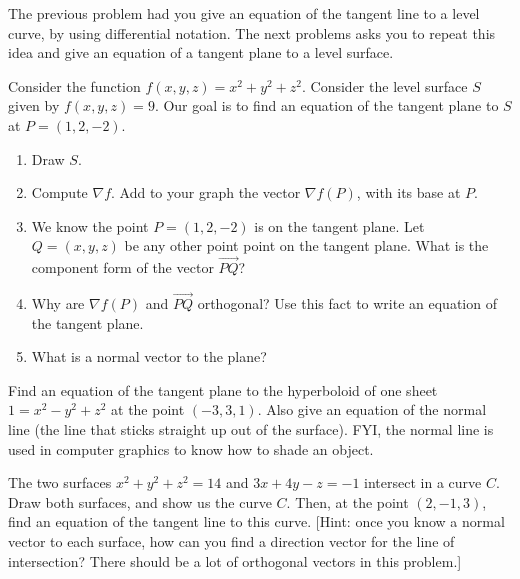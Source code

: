 The previous problem had you give an equation of the tangent line to a level curve, by using differential notation.  The next problems asks you to repeat this idea and give an equation of a tangent plane to a level surface.
\begin{problem}
 Consider the function $f(x,y,z)=x^2+y^2+z^2$.  Consider the level surface $S$ given by $f(x,y,z)=9$. Our goal is to find an equation of the tangent plane to $S$ at $P=(1,2,-2)$.
 \begin{enumerate}
  \item Draw $S$.
  \item Compute $\nabla f$. Add to your graph the vector $\nabla f(P)$, with its base at $P$. 
  \item We know the point $P=(1,2,-2)$ is on the tangent plane. Let $Q=(x,y,z)$ be any other point point on the tangent plane.  What is the component form of the vector $\vec {PQ}$?
  \item Why are  $\nabla f(P)$ and $\vec{PQ}$ orthogonal? Use this fact to write an equation of the tangent plane.
  \item What is a normal vector to the plane?
 \end{enumerate}
\end{problem}

\begin{problem}
 Find an equation of the tangent plane to the hyperboloid of one sheet $1=x^2-y^2+z^2$ at the point $(-3,3,1)$. Also give an equation of the normal line (the line that sticks straight up out of the surface).  FYI, the normal line is used in computer graphics to know how to shade an object.  
\end{problem}

\begin{problem}
 The two surfaces $x^2+y^2+z^2=14$ and $3x+4y-z=-1$ intersect in a curve $C$. Draw both surfaces, and show us the curve $C$. Then, at the point $(2,-1,3)$, find an equation of the tangent line to this curve. [Hint: once you know a normal vector to each surface, how can you find a direction vector for the line of intersection? There should be a lot of orthogonal vectors in this problem.]
\end{problem}

